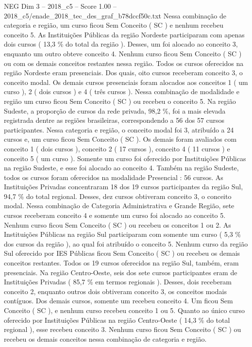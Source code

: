 \begin{textsample}{NEG Dim 3 – 2018\_c5 – Score 1.00 – 2018\_c5/enade\_2018\_tec\_des\_graf\_b78dccf50c.txt}
Nessa combinação de categoria e região, um curso ficou Sem Conceito ( SC ) e nenhum recebeu conceito 5.
As Instituições Públicas da região Nordeste participaram com apenas dois cursos ( 13,3 \% do total da região ).
Desses, um foi alocado ao conceito 3, enquanto um outro obteve conceito 4.
Nenhum curso ficou Sem Conceito ( SC ) ou com os demais conceitos restantes nessa região.
Todos os cursos oferecidos na região Nordeste eram presenciais.
Dos quais, oito cursos receberam conceito 3, o conceito modal.
Os demais cursos presenciais foram alocados aos conceitos 1 ( um curso ), 2 ( dois cursos ) e 4 ( três cursos ).
Nessa combinação de modalidade e região um curso ficou Sem Conceito ( SC ) ou recebeu o conceito 5.
Na região Sudeste, a proporção de cursos da rede privada, 98,2 \%, foi a mais elevada registrada dentre as regiões brasileiras, correspondendo a 56 dos 57 cursos participantes.
Nessa categoria e região, o conceito modal foi 3, atribuído a 24 cursos e, um curso ficou Sem Conceito ( SC ).
Os demais foram avaliados com conceito 1 ( dois cursos ), conceito 2 ( 17 cursos ), conceito 4 ( 11 cursos ) e conceito 5 ( um curso ).
Somente um curso foi oferecido por Instituições Públicas na região Sudeste, e esse foi alocado ao conceito 4.
Também na região Sudeste, todos os cursos foram oferecidos na modalidade Presencial : 56 cursos.
As Instituições Privadas concentraram 18 dos 19 cursos participantes da região Sul, 94,7 \% do total regional.
Desses, dez cursos obtiveram conceito 3, o conceito modal.
Nessa combinação de Categoria Administrativa e Grande Região, sete cursos receberam conceito 4 e somente um curso foi alocado ao conceito 5.
Nenhum curso ficou Sem Conceito ( SC ) ou recebeu os conceitos 1 ou 2.
As Instituições Públicas na região Sul participaram com somente um curso ( 5,3 \% dos cursos da região ), ao qual foi atribuído o conceito 5.
Nenhum curso da região Sul oferecido por IES Públicas ficou Sem Conceito ( SC ) ou recebeu os demais conceitos restantes.
Todos os 19 cursos oferecidos na região Sul, também, eram presenciais.
Na região Centro-Oeste, seis dos sete cursos participantes eram de Instituições Privadas ( 85,7 \% em termos regionais ).
Desses, dois receberam conceito 2, enquanto outros dois obtiveram conceito 3, os conceitos modais contíguos.
Dos demais cursos, somente um recebeu conceito 4.
Um ficou Sem Conceito ( SC ), e nenhum curso recebeu conceito 1 ou 5.
Quanto ao único curso oferecido por Instituições Públicas na região Centro-Oeste ( 14,3 \% do total regional ), esse recebeu conceito 3.
Nenhum curso ficou Sem Conceito ( SC ) ou recebeu os demais conceitos nessa combinação de categoria e região.

\end{textsample}
